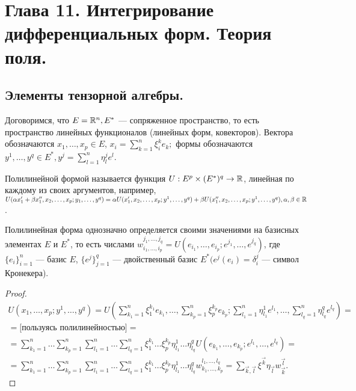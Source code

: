 \section{Глава 11. Интегрирование дифференциальных форм. Теория поля.}
 \subsection{Элементы тензорной алгебры.}
Договоримся, что $E = \mathbb{R}^n, E^*$ --- сопряженное пространство, то есть пространство линейных функционалов (линейных форм, ковекторов). Вектора обозначаются $x_1, \ldots, x_p \in E$, $x_i=\sum\limits_{k=1}^n \xi_i^k e_k;$ формы обозначаются $y^1, \ldots, y^q\in E^*, y^j=\sum\limits_{l=1}^n \eta_l^j e^l$. 
\begin{Def}
	Полилинейной формой называется функция $U:E^p\times(E^*)^q\rightarrow \R$, линейная по каждому из своих аргументов, например, $U(\alpha x_1'+\beta x_1'', x_2, \ldots, x_p; y_1, \ldots, y^q)=\alpha U(x_1', x_2, \ldots, x_p;y^1, \ldots, y^q)+\beta U(x_1'', x_2, \ldots, x_p;y^1, \ldots, y^q), \alpha, \beta \in \R$.
\end{Def}
\begin{prop}
	Полилинейная форма однозначно определяется своими значениями на базисных элементах $E$ и $E^*$, то есть числами $w_{i_1, \ldots, i_p}^{j_1, \ldots, j_q} = U(e_{i_1}, \ldots, e_{i_p}; e^{j_1}, \ldots, e^{j_q})$, где $\{e_i\}_{i=1}^n$ --- базис $E$, $\{e^j\}_{j=1}^q$ --- двойственный базис $E^* (e^j(e_i)=\delta_i^j$ --- символ Кронекера).
\end{prop}
\begin{proof}
	\begin{multline*}
		U(x_1, \ldots, x_p; y^1, \ldots, y^q) = U(\sum\limits_{k_1=1}^n \xi_1^{k_1} e_{k_1}, \ldots, \sum\limits_{k_p=1}^n \xi_p^{k_p} e_{k_p}; \sum\limits_{l_1=1}^n \eta_{l_1}^1 e^{l_1}, \ldots, \sum\limits_{l_q=1}^n \eta_{l_q}^q e^{l_q})= \\ =
		\text{[пользуясь полилинейностью]} = \\ = \sum\limits_{k_1=1}^n \ldots \sum\limits_{k_p=1}^n\sum\limits_{l_1=1}^n\ldots\sum\limits_{l_q=1}^n \xi_1^{k_1}\ldots\xi_p^{k_p}\eta_{l_1}^1\ldots\eta_{l_q}^q U(e_{k_1}, \ldots, e_{k_p};e^{l_1}, \ldots, e^{l_q}) = \\ =
		\sum\limits_{k_1=1}^n \ldots \sum\limits_{k_p=1}^n\sum\limits_{l_1=1}^n\ldots\sum\limits_{l_q=1}^n \xi_1^{k_1}\ldots\xi_p^{k_p}\eta_{l_1}^1\ldots\eta_{l_q}^q w_{k_1, \ldots, k_p}^{l_1, \ldots, l_q} = \sum_{\overrightarrow{k}, \overrightarrow{l}}\xi^{\overrightarrow{k}}\eta_{\overrightarrow{l}}w_{\overrightarrow{k}}^{\overrightarrow{l}}.
	\end{multline*}
\end{proof}

